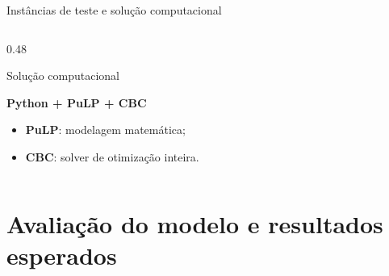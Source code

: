 \documentclass{beamer}
\begin{document}
\begin{frame}{Instâncias de teste e solução computacional}
\begin{columns}[T,onlytextwidth]
\begin{column}{0.48\textwidth}
\begin{block}{Solução computacional}
        \begin{center}
            \textbf{Python + PuLP + CBC}
        \end{center}

        \begin{itemize}
            \setlength{\itemsep}{0.05cm}
            \item \textbf{PuLP}: modelagem matemática;
            \item \textbf{CBC}: solver de otimização inteira.
        \end{itemize}

    \end{block}

\end{column}

\end{columns}

\end{frame}

\section{Avaliação do modelo e resultados esperados}
\end{document}
